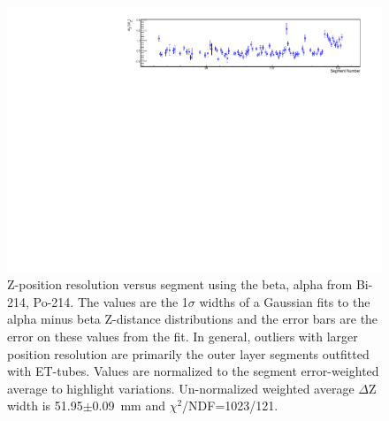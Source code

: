 \begin{figure}[!h]
\centering
\includegraphics[width=1.05\textwidth]{figures/PubBiPo214dZWidthvsCell.pdf}
\caption{\label{fig:ZresvsCell214}Z-position resolution versus segment using the beta, alpha from Bi-214, Po-214. The values are the 1$\sigma$ widths of a Gaussian fits to the alpha minus beta Z-distance distributions and the error bars are the error on these values from the fit. In general, outliers with larger position resolution are primarily the outer layer segments outfitted with ET-tubes. Values are normalized to the segment error-weighted average to highlight variations. Un-normalized weighted average $\Delta$Z width is 51.95$\pm$0.09~mm and $\chi^2$/NDF=1023/121.}
\end{figure}
\clearpage
\newpage

